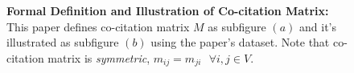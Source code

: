 \begin{figure}[ht]
    \begin{subfigure}[b]{1\textwidth}
        \centering
        
    \end{subfigure}
    \vfill
    \begin{subfigure}[b]{1\textwidth}
        \centering
        \centering
        
    \end{subfigure}
    \label{fig:def-illus-co-cites}
    \caption{\textbf{Formal Definition and Illustration of Co-citation Matrix:} This paper defines co-citation matrix $M$ as subfigure $(a)$ and it's illustrated as subfigure $(b)$ using the paper's dataset. Note that co-citation matrix is \textit{symmetric}, $m_{ij} = m_{ji} \text{ } \forall i,j \in V$.}
\end{figure}
